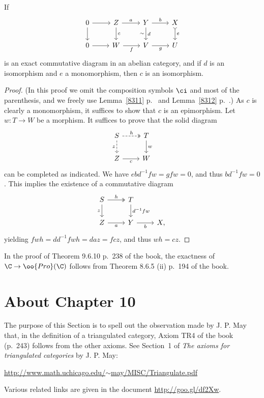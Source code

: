 \documentclass[12pt]{article}
\theoremstyle{remark}
\theoremstyle{definition}
\begin{document}
\begin{s}
\begin{lem} 
If 
$$
\begin{tikzcd}
0\ar[d]\ar[r]&Z\ar[d,"c"]\ar[r,"a"]&Y\ar[d,"d","\sim"']\ar[r,"b"]&X\ar[d,rightarrowtail,"e"]\\ 
0\ar[r,]&W\ar[r,"f"']&V\ar[r,"g"']&U
\end{tikzcd}
$$ 
is an exact commutative diagram in an abelian category, and if $d$ is an isomorphism and $e$ a monomorphism, then $c$ is an isomorphism.
\end{lem} 

\begin{proof}
(In this proof we omit the composition symbols $\ci$ and most of the parenthesis, and we freely use Lemma~\ref{8311} p.~ and Lemma~\ref{8312} p.~.) As $c$ is clearly a monomorphism, it suffices to show that $c$ is an epimorphism. Let $w:T\to W$ be a morphism. It suffices to prove that the solid diagram 
$$
\begin{tikzcd} 
S\ar[d,dashed,"z"']\ar[r,dashed,two heads,"h"]&T\ar[d,"w"]\\ 
Z\ar[r,"c"']&W
\end{tikzcd}
$$ 
can be completed as indicated. We have $ebd^{-1}fw=gfw=0$, and thus $bd^{-1}fw=0$. This implies the existence of a commutative diagram 
$$
\begin{tikzcd} 
S\ar[d,"z"']\ar[r,two heads,"h"]&T\ar[d,"d^{-1}fw"]\\ 
Z\ar[r,"a"']&Y\ar[r,"b"']&X,
\end{tikzcd}
$$ 
yielding $fwh=dd^{-1}fwh=daz=fcz$, and thus $wh=cz$. 
\end{proof} 

In the proof of Theorem 9.6.10 p.~238 of the book, the exactness of $\C\to\oo{Pro}(\C)$ follows from Theorem 8.6.5 (ii) p.~194 of the book.
\end{s}


\section{About Chapter 10}


The purpose of this Section is to spell out the observation made by J. P. May that, in the definition of a triangulated category, Axiom TR4 of the book (p.~243) follows from the other axioms. See Section~1 of {\em The axioms for triangulated categories} by J. P. May: 
\begin{center}\href{http://www.math.uchicago.edu/~may/MISC/Triangulate.pdf}{http://www.math.uchicago.edu/$\sim$may/MISC/Triangulate.pdf} 
\end{center} 
Various related links are given in the document \href{http://goo.gl/df2Xw}{http://goo.gl/df2Xw}. 
\end{document}
